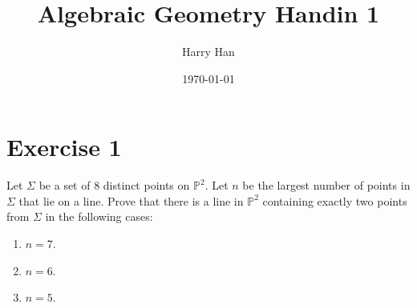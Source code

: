 \documentclass{article}
\title{Algebraic Geometry Handin 1}
\author{Harry Han}
\date{\today}
\theoremstyle{definition}
\theoremstyle{definition}
\theoremstyle{remark}
\begin{document}
\maketitle
\section*{Exercise 1}
Let \(\Sigma\) be a set of 8 distinct points on \(\mathbb{P}^2\). Let \(n\) be the largest number of points in \(\Sigma\) that lie on a line. Prove that there is a line in \(\mathbb{P}^2\) containing exactly two points from \(\Sigma\) in the following cases:
\begin{enumerate}
    \item \(n = 7\).
    \item \(n = 6\).
    \item \(n = 5\).
\end{enumerate}
\end{document}
